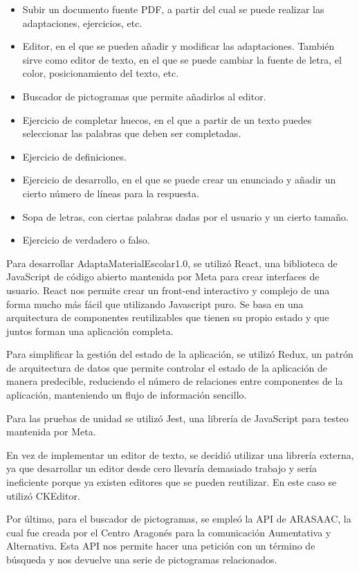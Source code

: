 \begin{itemize}
    \item Subir un documento fuente PDF, a partir del cual se puede realizar las adaptaciones, ejercicios, etc.
    \item Editor, en el que se pueden añadir y modificar las adaptaciones. También sirve como editor de texto, en el que se puede cambiar la fuente de letra, el color, posicionamiento del texto, etc.
    \item Buscador de pictogramas que permite añadirlos al editor.
    \item Ejercicio de completar huecos, en el que a partir de un texto puedes seleccionar las palabras que deben ser completadas.
    \item Ejercicio de definiciones.
    \item Ejercicio de desarrollo, en el que se puede crear un enunciado y añadir un cierto número de líneas para la respuesta.
    \item Sopa de letras, con ciertas palabras dadas por el usuario y un cierto tamaño.
    \item Ejercicio de verdadero o falso.
\end{itemize}

Para desarrollar AdaptaMaterialEscolar1.0, se utilizó React, una biblioteca de JavaScript de código abierto mantenida por Meta para crear interfaces de usuario. React nos permite crear un front-end interactivo y complejo de una forma mucho más fácil que utilizando Javascript puro. Se basa en una arquitectura de componentes reutilizables que tienen su propio estado y que juntos forman una aplicación completa.

Para simplificar la gestión del estado de la aplicación, se utilizó Redux, un patrón de arquitectura de datos que permite controlar el estado de la aplicación de manera predecible, reduciendo el número de relaciones entre componentes de la aplicación, manteniendo un flujo de información sencillo.

Para las pruebas de unidad se utilizó Jest, una librería de JavaScript para testeo mantenida por Meta.

En vez de implementar un editor de texto, se decidió utilizar una librería externa, ya que desarrollar un editor desde cero llevaría demasiado trabajo y sería ineficiente porque ya existen editores que se pueden reutilizar. En este caso se utilizó CKEditor.

Por último, para el buscador de pictogramas, se empleó la API de ARASAAC, la cual fue creada por el Centro Aragonés para la comunicación Aumentativa y Alternativa. Esta API nos permite hacer una petición con un término de búsqueda y nos devuelve una serie de pictogramas relacionados.


